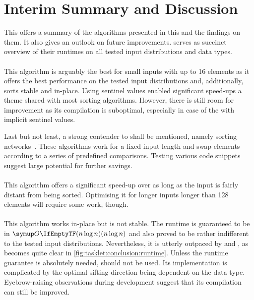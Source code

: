 \section{Interim Summary and Discussion}
\label{sec:tasklet:conclusion}


This  offers a summary of the algorithms presented in this  and the findings on them.
It also gives an outlook on future improvements.
 serves as succinct overview of their runtimes on all tested input distributions and data types.


\paragraph{\IS{}}
This algorithm is arguably the best for small inputs with up to 16 elements as it offers the best performance on the tested input distributions and, additionally, sorts stable and in-place.
Using sentinel values enabled significant speed-ups \Dash a theme shared with most sorting algorithms.
However, there is still room for improvement as its compilation is suboptimal, especially in case of the \IS{} with implicit sentinel values.

Last but not least, a strong contender to \IS{} shall be mentioned, namely sorting networks~\cite{codish2017sortingnetworks}.
These algorithms work for a fixed input length and swap elements according to a series of predefined comparisons.
Testing various code snippets~\cites[9]{codish2017sortingnetworks}{m2015fastestway}{paulr2010fastestsort} suggest large potential for further savings.


\paragraph{\ShS{}}
This  algorithm offers a significant speed-up over \IS{} as long as the input is fairly distant from being sorted.
Optimising it for longer inputs longer than 128 elements will require some work, though.


\paragraph{\HS{}}
This algorithm works in-place but is not stable.
The runtime is guaranteed to be in \(\bigoh{n \log n}\) and also proved to be rather indifferent to the tested input distributions.
Nevertheless, it is utterly outpaced by \QS{} and \MS{}, as becomes quite clear in \cref{fig:tasklet:conclusion:runtime}.
Unless the runtime guarantee is absolutely needed, \HS{} should not be used.
Its implementation is complicated by the optimal sifting direction being dependent on the data type.
Eyebrow-raising observations during development suggest that its compilation can still be improved.

